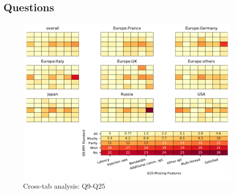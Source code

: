 
\subsection{Questions}


\begin{figure}
\begin{center}
\includegraphics[width=12cm]{../pdfs/Q9-Q25.pdf}
\caption{Cross-tab analysis: Q9-Q25}
\label{fig:Q9-Q25}
\end{center}
\end{figure}
